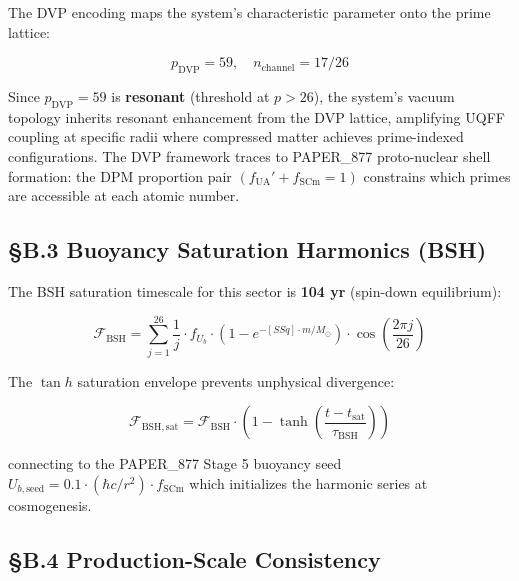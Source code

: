 \documentclass[12pt,a4paper]{article}
\begin{document}
The DVP encoding maps the system's characteristic parameter onto the prime lattice:

\begin{equation}
p_{\mathrm{DVP}} = 59, \quad n_{\mathrm{channel}} = 17/26
\end{equation}

Since $p_{\mathrm{DVP}} = 59$ is \textbf{resonant} (threshold at $p > 26$), the system's vacuum topology inherits resonant enhancement from the DVP lattice, amplifying UQFF coupling at specific radii where compressed matter achieves prime-indexed configurations. The DVP framework traces to PAPER\_877 proto-nuclear shell formation: the DPM proportion pair $(f_{\mathrm{UA}}' + f_{\mathrm{SCm}} = 1)$ constrains which primes are accessible at each atomic number.

\subsection{\S{}B.3 Buoyancy Saturation Harmonics (BSH)}

The BSH saturation timescale for this sector is \textbf{104 yr} (spin-down equilibrium):

\begin{equation}
\mathcal{F}_{\mathrm{BSH}} = \sum_{j=1}^{26} \frac{1}{j} \cdot f_U_b \cdot \left(1 - e^{-[SSq] \cdot m/M_\odot}\right) \cdot \cos\!\left(\frac{2\pi j}{26}\right)
\end{equation}

The $\tan h$ saturation envelope prevents unphysical divergence:

\begin{equation}
\mathcal{F}_{\mathrm{BSH,sat}} = \mathcal{F}_{\mathrm{BSH}} \cdot \left(1 - \tanh\!\left(\frac{t - t_{\mathrm{sat}}}{\tau_{\mathrm{BSH}}}\right)\right)
\end{equation}

connecting to the PAPER\_877 Stage 5 buoyancy seed $U_{b,\mathrm{seed}} = 0.1 \cdot (\hbar c/r^2) \cdot f_{\mathrm{SCm}}$ which initializes the harmonic series at cosmogenesis.

\subsection{\S{}B.4 Production-Scale Consistency}
\end{document}
